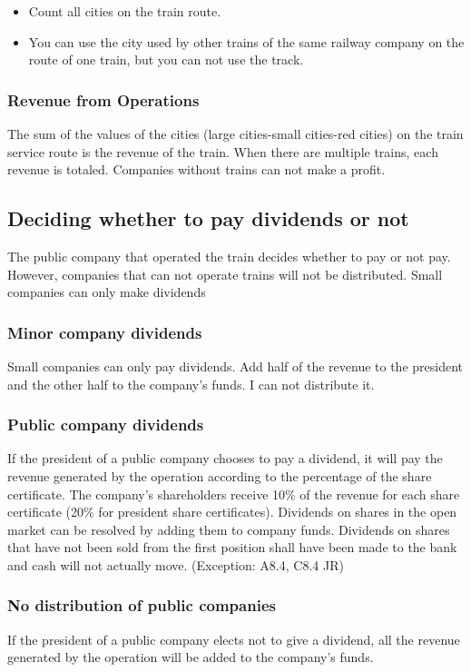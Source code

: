 \documentclass{article}
\begin{document}
\begin{CJK}{UTF8}{min}
\begin{itemize}
\item Count all cities on the train route.

\item You can use the city used by other trains of the same railway
  company on the route of one train, but you can not use the track.
\end{itemize}

\subsubsection{Revenue from Operations}
The sum of the values ​​of the cities (large cities-small cities-red
cities) on the train service route is the revenue of the train. When
there are multiple trains, each revenue is totaled. Companies without
trains can not make a profit.

\subsection{Deciding whether to pay dividends or not}
The public company that operated the train decides whether to pay or
not pay. However, companies that can not operate trains will not be
distributed. Small companies can only make dividends

\subsubsection{Minor company dividends}
Small companies can only pay dividends. Add half of the revenue to the
president and the other half to the company's funds. I can not
distribute it.

\subsubsection{Public company dividends}
If the president of a public company chooses to pay a dividend, it
will pay the revenue generated by the operation according to the
percentage of the share certificate. The company's shareholders
receive 10\% of the revenue for each share certificate (20\% for
president share certificates). Dividends on shares in the open market
can be resolved by adding them to company funds. Dividends on shares
that have not been sold from the first position shall have been made
to the bank and cash will not actually move.  (Exception: A8.4, C8.4
JR)

\subsubsection{No distribution of public companies}
If the president of a public company elects not to give a dividend,
all the revenue generated by the operation will be added to the
company's funds.


\end{CJK}
\end{document}
